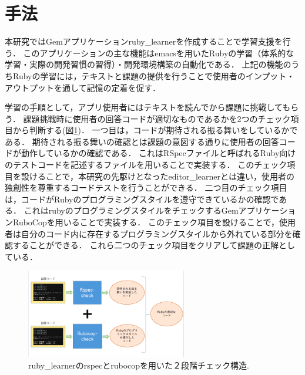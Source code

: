 \documentclass[a4j,twocolumn]{jsarticle}
\begin{document}
\section{手法}
本研究ではGemアプリケーションruby\_learner\cite{RubyGems}を作成することで学習支援を行う．
このアプリケーションの主な機能はemacsを用いたRubyの学習（体系的な学習・実際の開発習慣の習得）・開発環境構築の自動化である．
上記の機能のうちRubyの学習には，テキストと課題の提供を行うことで使用者のインプット・アウトプットを通して記憶の定着を促す．
\par
学習の手順として，アプリ使用者にはテキストを読んでから課題に挑戦してもらう．
課題挑戦時に使用者の回答コードが適切なものであるかを2つのチェック項目から判断する(図\ref{fig:one})．
一つ目は，コードが期待される振る舞いをしているかである．
期待される振る舞いの確認とは課題の意図する通りに使用者の回答コードが動作しているかの確認である．
これはRSpecファイル\cite{rspec}と呼ばれるRuby向けのテストコードを記述するファイルを用いることで実装する．
このチェック項目を設けることで，本研究の先駆けとなったeditor\_learner\cite{editor_learner}とは違い，使用者の独創性を尊重するコードテストを行うことができる．
二つ目のチェック項目は，コードがRubyのプログラミングスタイルを遵守できているかの確認である．
これはrubyのプログラミングスタイルをチェックするGemアプリケーションRuboCop\cite{rubocop}を用いることで実装する．
このチェック項目を設けることで，使用者は自分のコード内に存在するプログラミングスタイルから外れている部分を確認することができる．
これら二つのチェック項目をクリアして課題の正解としている．

\begin{figure}[h]
\vspace{0\baselineskip}
\begin{center}
  \includegraphics[width=70mm]{./rspec_rubocop.png}
  \caption{ruby\_learnerのrspecとrubocopを用いた２段階チェック構造.}
  \label{fig:one}
\end{center}
\end{figure}
\end{document}
